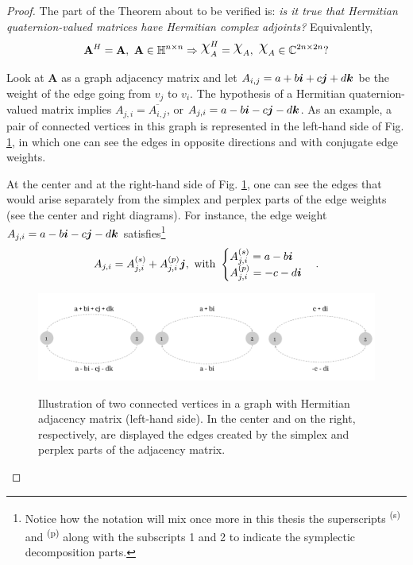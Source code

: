 \begin{proof}
    The part of the Theorem about to be verified is: \emph{is it true that Hermitian quaternion-valued matrices have Hermitian complex adjoints?} Equivalently,
    \begin{equation}
        \mathbf{A}^H = \mathbf{A}, \ \mathbf{A} \in \mathbb{H}^{n \times n} \Rightarrow
        \rchi_{A}^H = \rchi_{A}, \ \rchi_{A} \in \mathbb{C}^{2n \times 2n}?
    \end{equation}

    Look at $\mathbf{A}$ as a graph adjacency matrix and let $A_{i,j} = a + b\boldsymbol{i} + c\boldsymbol{j} + d\boldsymbol{k}$ be the weight of the edge going from $v_j$ to $v_i$. The hypothesis of a Hermitian quaternion-valued matrix implies $A_{j,i} = \overline{A_{i,j}}$, or $A_{j,i} = a - b\boldsymbol{i} - c\boldsymbol{j} - d\boldsymbol{k}$. As an example, a pair of connected vertices in this graph is represented in the left-hand side of Fig. \ref{fig:hermitian-crop-2}, in which one can see the edges in opposite directions and with conjugate edge weights.

    At the center and at the right-hand side of Fig. \ref{fig:hermitian-crop-2}, one can see the edges that would arise separately from the simplex and perplex parts of the edge weights (see the center and right diagrams). For instance, the edge weight $A_{j,i} = a - b\boldsymbol{i} - c\boldsymbol{j} - d\boldsymbol{k}$ satisfies\footnote{Notice how the notation will mix once more in this thesis the superscripts \textsuperscript{(s)} and \textsuperscript{(p)} along with the subscripts 1 and 2 to indicate the symplectic decomposition parts.}
    \begin{equation}
        A_{j,i} = A^{(s)}_{j,i} + A^{(p)}_{j,i} \boldsymbol{j}, \text{ with }
        \begin{cases}
            A^{(s)}_{j,i} = a - b\boldsymbol{i} \\
            A^{(p)}_{j,i} = -c -d \boldsymbol{i}
        \end{cases}.
    \end{equation}

    \begin{figure}
        \centering
        \caption{Illustration of two connected vertices in a graph with Hermitian adjacency matrix (left-hand side). In the center and on the right, respectively, are displayed the edges created by the simplex and perplex parts of the adjacency matrix.}
        \includegraphics[width=0.95\linewidth]{Figures/hermitian-crop-2.pdf}
        \floatsource
        \label{fig:hermitian-crop-2}
    \end{figure}


\end{proof}
